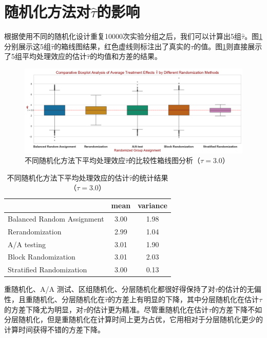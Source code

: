 \section{随机化方法对$\hat{\tau}$的影响}
根据使用不同的随机化设计重复10000次实验分组之后，我们可以计算出5组$\hat{\tau}$。图\ref{fig:Comparative Boxplot Analysis}分别展示这5组$\hat{\tau}$的箱线图结果，红色虚线则标注出了真实的$\tau$的值。图\ref{tab:Comparative stats Analysis of Average Treatment Effects}则直接展示了5组平均处理效应的估计$\hat{\tau}$的均值和方差的结果。
\begin{figure}[!htbp]
    \centering
    \includegraphics[width=1.00\linewidth]{figures/Comparative Boxplot Analysis of Average Treatment Effects.png}
    \caption{不同随机化方法下平均处理效应$\hat{\tau}$的比较性箱线图分析（$\tau=3.0$）}
    \label{fig:Comparative Boxplot Analysis}
\end{figure}

\begin{table}[!htbp]
    \centering
        \begin{tabular}{lcc}
        \toprule
         & mean & variance \\
        \midrule
        Balanced Random Assignment & 3.00 & 1.98 \\
        Rerandomization & 2.99 & 1.04 \\
        A/A testing & 3.01 & 1.90 \\
        Block Randomization & 3.01 & 2.03 \\
        Stratified Randomization & 3.00 & 0.13 \\
        \bottomrule
        \end{tabular}
    \caption{不同随机化方法下平均处理效应的估计$\hat{\tau}$的统计结果（$\tau=3.0$）}
    \label{tab:Comparative stats Analysis of Average Treatment Effects}
\end{table}

重随机化、A/A 测试、区组随机化、分层随机化都很好得保持了对$\tau$的估计的无偏性，且重随机化、分层随机化在$\hat{\tau}$的方差上有明显的下降，其中分层随机化在估计$\tau$的方差下降尤为明显，对$\tau$的估计更为精准。尽管重随机化在估计$\tau$的方差下降不如分层随机化，但是重随机化在计算时间上更为占优，它用相对于分层随机化更少的计算时间获得不错的方差下降。

